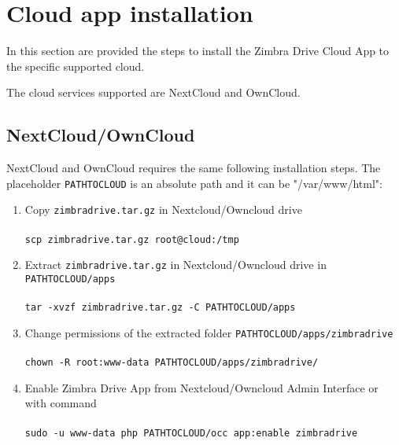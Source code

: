 \section{Cloud app installation}

In this section are provided the steps to install the Zimbra Drive Cloud App to the specific supported cloud.
\begin{warning}
The cloud services supported are NextCloud and OwnCloud.
\end{warning}

\subsection{NextCloud/OwnCloud}\label{subsec:nextcloudOwncloudInstallation}
    NextCloud and OwnCloud requires the same following installation steps.
    The placeholder \texttt{PATH\textunderscore TO\textunderscore CLOUD} is an absolute path and it can be "/var/www/html":

    \begin{enumerate}
        \item Copy \texttt{zimbradrive.tar.gz} in Nextcloud/Owncloud drive\\ \\
        \texttt{scp zimbradrive.tar.gz root@cloud:/tmp}\\
        \item Extract \texttt{zimbradrive.tar.gz} in Nextcloud/Owncloud drive in \texttt{PATH\textunderscore TO\textunderscore CLOUD/apps}\\ \\
        \texttt{tar -xvzf zimbradrive.tar.gz -C \texttt{PATH\textunderscore TO\textunderscore CLOUD}/apps}\\
        \item Change permissions of the extracted folder \texttt{PATH\textunderscore TO\textunderscore CLOUD/apps/zimbradrive}\\ \\
        \texttt{chown -R root:www-data PATH\textunderscore TO\textunderscore CLOUD/apps/zimbradrive/}\\
        \item Enable Zimbra Drive App from Nextcloud/Owncloud Admin Interface or with command %
        \\ \\
        \texttt{sudo -u www-data php PATH\textunderscore TO\textunderscore CLOUD/occ app:enable zimbradrive}
    \end{enumerate}


